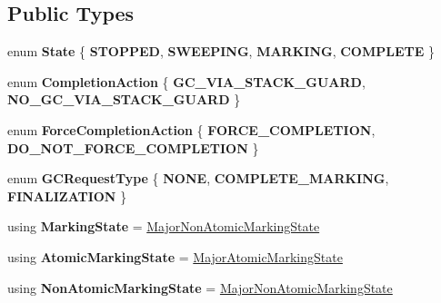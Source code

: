 \subsection*{Public Types}
\begin{DoxyCompactItemize}
\item 
\mbox{\label{classv8_1_1internal_1_1IncrementalMarking_a0cf5484619bc97cfba5060b3c29102c4}} 
enum {\bfseries State} \{ {\bfseries S\+T\+O\+P\+P\+ED}, 
{\bfseries S\+W\+E\+E\+P\+I\+NG}, 
{\bfseries M\+A\+R\+K\+I\+NG}, 
{\bfseries C\+O\+M\+P\+L\+E\+TE}
 \}
\item 
\mbox{\label{classv8_1_1internal_1_1IncrementalMarking_a9b543810ec8c13b61aa9dfebb33743a5}} 
enum {\bfseries Completion\+Action} \{ {\bfseries G\+C\+\_\+\+V\+I\+A\+\_\+\+S\+T\+A\+C\+K\+\_\+\+G\+U\+A\+RD}, 
{\bfseries N\+O\+\_\+\+G\+C\+\_\+\+V\+I\+A\+\_\+\+S\+T\+A\+C\+K\+\_\+\+G\+U\+A\+RD}
 \}
\item 
\mbox{\label{classv8_1_1internal_1_1IncrementalMarking_aee6b9724805db0c072debe78a5c1d729}} 
enum {\bfseries Force\+Completion\+Action} \{ {\bfseries F\+O\+R\+C\+E\+\_\+\+C\+O\+M\+P\+L\+E\+T\+I\+ON}, 
{\bfseries D\+O\+\_\+\+N\+O\+T\+\_\+\+F\+O\+R\+C\+E\+\_\+\+C\+O\+M\+P\+L\+E\+T\+I\+ON}
 \}
\item 
\mbox{\label{classv8_1_1internal_1_1IncrementalMarking_a819a2e85f38bbdd8e1265c4b16dbf448}} 
enum {\bfseries G\+C\+Request\+Type} \{ {\bfseries N\+O\+NE}, 
{\bfseries C\+O\+M\+P\+L\+E\+T\+E\+\_\+\+M\+A\+R\+K\+I\+NG}, 
{\bfseries F\+I\+N\+A\+L\+I\+Z\+A\+T\+I\+ON}
 \}
\item 
\mbox{\label{classv8_1_1internal_1_1IncrementalMarking_ad1b1d1eba7cb5f59113c6c2433b9af01}} 
using {\bfseries Marking\+State} = \mbox{\hyperlink{classv8_1_1internal_1_1MajorNonAtomicMarkingState}{Major\+Non\+Atomic\+Marking\+State}}
\item 
\mbox{\label{classv8_1_1internal_1_1IncrementalMarking_a338996e2ecd8ec1814898de98fb51b3a}} 
using {\bfseries Atomic\+Marking\+State} = \mbox{\hyperlink{classv8_1_1internal_1_1MajorAtomicMarkingState}{Major\+Atomic\+Marking\+State}}
\item 
\mbox{\label{classv8_1_1internal_1_1IncrementalMarking_a0d677eb036880e68402403b4a8f4a3ce}} 
using {\bfseries Non\+Atomic\+Marking\+State} = \mbox{\hyperlink{classv8_1_1internal_1_1MajorNonAtomicMarkingState}{Major\+Non\+Atomic\+Marking\+State}}
\end{DoxyCompactItemize}

